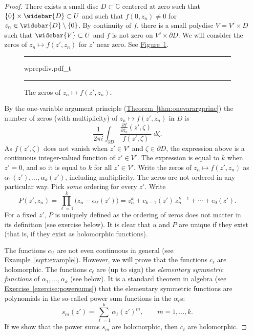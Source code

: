 \documentclass[12pt,openany]{book}
\newcommand{\C}{{\mathbb{C}}}
\theoremstyle{plain}
\theoremstyle{remark}
\theoremstyle{definition}
\newenvironment{myfig}{%
\begin{figure}[h!t]
\noindent\rule{\textwidth}{0.5pt}\vspace{12pt}\par\centering}%
{\par\noindent\rule{\textwidth}{0.5pt}
\end{figure}}
\theoremstyle{exercise}
\theoremstyle{example}
\newcommand{\figureref}[1]{\hyperref[#1]{Figure~\ref*{#1}}}
\newcommand{\exerciseref}[1]{\hyperref[#1]{Exercise~\ref*{#1}}}
\newcommand{\exampleref}[1]{\hyperref[#1]{Example~\ref*{#1}}}
\newcommand{\thmref}[1]{\hyperref[#1]{Theorem~\ref*{#1}}}
\begin{document}
\begin{proof}
There exists a small disc $D \subset \C$ centered at zero such that
$\{0\} \times \widebar{D} \subset U$ and such that
$f(0,z_n) \not= 0$ for $z_n \in \widebar{D} \setminus \{ 0 \}$.
By continuity
of $f$,
there is a small polydisc $V = V' \times D$ such that
$\widebar{V} \subset U$ and $f$ is not zero on
$V' \times \partial D$.  We will consider the zeros of
$z_n \mapsto f(z',z_n)$ for $z'$ near zero.  See \figureref{fig:wprepdiv}.

\begin{myfig}
{wprepdiv.pdf_t}
\caption{The zeros of $z_n \mapsto f(z',z_n)$.\label{fig:wprepdiv}}
\end{myfig}

By the one-variable argument principle (\thmref{thm:onevarargprinc}) the number of zeros (with
multiplicity) of $z_n
\mapsto f(z',z_n)$ in $D$ is
\begin{equation*}
\frac{1}{2\pi i}
\int_{\partial D}
\frac{\frac{\partial f}{\partial z_n} (z',\zeta)}{f(z',\zeta)} ~d\zeta .
\end{equation*}
As $f(z',\zeta)$ does not vanish when $z' \in V'$ and $\zeta \in \partial
D$,
the expression above is a continuous integer-valued
function of $z' \in V'$.
The expression
is equal to $k$ when $z'=0$, and
so it is equal to $k$ for all $z' \in V'$.
Write
the zeros of $z_n \mapsto f(z',z_n)$ as $\alpha_1(z'),\ldots,\alpha_k(z')$, including
multiplicity.  The zeros are not ordered in any particular way.
Pick \emph{some} ordering for every $z'$.
Write
\begin{equation*}
P(z',z_n)
=
\prod_{\ell=1}^k \bigl(z_n-\alpha_\ell(z')\bigr)
=
z_n^k + c_{k-1}(z') \, z_n^{k-1} + \cdots + c_0 (z') .
\end{equation*}
For a fixed $z'$, $P$ is uniquely defined as the ordering of zeros does not
matter in its definition (see exercise below).  It is
clear that
$u$ and $P$ are unique if they exist (that is, if they exist as holomorphic functions).

The functions $\alpha_\ell$ are not even continuous in general (see
\exampleref{sqrt:example}).  However,
we will prove that the functions $c_\ell$ are holomorphic.  The functions
$c_\ell$ are
(up to sign)
the \emph{elementary symmetric functions}
of $\alpha_1,\ldots,\alpha_k$ (see below).  It is a standard
theorem in algebra
(see \exerciseref{exercise:powersums})
that the elementary symmetric functions are
polynomials in the so-called power sum functions in the $\alpha_\ell$s:
\begin{equation*}
s_m(z') = \sum_{\ell=1}^k \alpha_\ell{(z')}^m , \qquad m = 1,\ldots,k.
\end{equation*}
If we show that the power sums $s_m$ are holomorphic, then
$c_\ell$ are holomorphic.


\end{proof}
\end{document}
